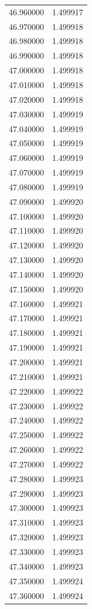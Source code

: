 \begin{tabular}{rr}
46.960000 & 1.499917 \\
46.970000 & 1.499918 \\
46.980000 & 1.499918 \\
46.990000 & 1.499918 \\
47.000000 & 1.499918 \\
47.010000 & 1.499918 \\
47.020000 & 1.499918 \\
47.030000 & 1.499919 \\
47.040000 & 1.499919 \\
47.050000 & 1.499919 \\
47.060000 & 1.499919 \\
47.070000 & 1.499919 \\
47.080000 & 1.499919 \\
47.090000 & 1.499920 \\
47.100000 & 1.499920 \\
47.110000 & 1.499920 \\
47.120000 & 1.499920 \\
47.130000 & 1.499920 \\
47.140000 & 1.499920 \\
47.150000 & 1.499920 \\
47.160000 & 1.499921 \\
47.170000 & 1.499921 \\
47.180000 & 1.499921 \\
47.190000 & 1.499921 \\
47.200000 & 1.499921 \\
47.210000 & 1.499921 \\
47.220000 & 1.499922 \\
47.230000 & 1.499922 \\
47.240000 & 1.499922 \\
47.250000 & 1.499922 \\
47.260000 & 1.499922 \\
47.270000 & 1.499922 \\
47.280000 & 1.499923 \\
47.290000 & 1.499923 \\
47.300000 & 1.499923 \\
47.310000 & 1.499923 \\
47.320000 & 1.499923 \\
47.330000 & 1.499923 \\
47.340000 & 1.499923 \\
47.350000 & 1.499924 \\
47.360000 & 1.499924 \\

\end{tabular}
